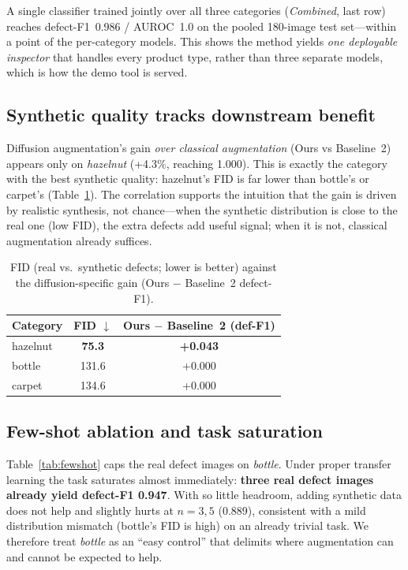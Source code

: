 \documentclass[11pt]{article}
\begin{document}
A single classifier trained jointly over all three categories
(\textit{Combined}, last row) reaches defect-F1~0.986 / AUROC~1.0 on the pooled
180-image test set---within a point of the per-category models. This shows the
method yields \emph{one deployable inspector} that handles every product type,
rather than three separate models, which is how the demo tool is served.

\subsection{Synthetic quality tracks downstream benefit}
Diffusion augmentation's gain \emph{over classical augmentation} (Ours vs
Baseline~2) appears only on \textit{hazelnut} (+4.3\%, reaching 1.000). This is
exactly the category with the best synthetic quality: hazelnut's FID is far lower
than bottle's or carpet's (Table~\ref{tab:fid}). The correlation supports the
intuition that the gain is driven by realistic synthesis, not chance---when the
synthetic distribution is close to the real one (low FID), the extra defects add
useful signal; when it is not, classical augmentation already suffices.

\begin{table}[h]
\centering
\caption{FID (real vs.\ synthetic defects; lower is better) against the
diffusion-specific gain (Ours $-$ Baseline~2 defect-F1).}
\label{tab:fid}
\begin{tabular}{lcc}
\toprule
Category & FID $\downarrow$ & Ours $-$ Baseline~2 (def-F1) \\
\midrule
hazelnut & \textbf{75.3} & \textbf{+0.043} \\
bottle   & 131.6 & +0.000 \\
carpet   & 134.6 & +0.000 \\
\bottomrule
\end{tabular}
\end{table}

\subsection{Few-shot ablation and task saturation}
Table~\ref{tab:fewshot} caps the real defect images on \textit{bottle}. Under
proper transfer learning the task saturates almost immediately: \textbf{three
real defect images already yield defect-F1 0.947}. With so little headroom,
adding synthetic data does not help and slightly hurts at $n=3,5$ (0.889),
consistent with a mild distribution mismatch (bottle's FID is high) on an already
trivial task. We therefore treat \textit{bottle} as an ``easy control'' that
delimits where augmentation can and cannot be expected to help.
\end{document}

